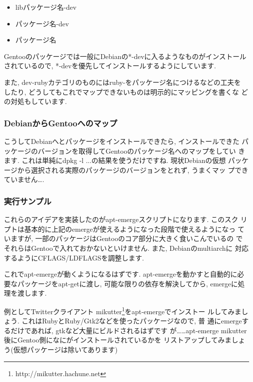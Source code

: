 \documentclass[mingoth,a4paper]{jsarticle}
\begin{document}
\begin{itemize}
\item libパッケージ名-dev
\item パッケージ名-dev
\item パッケージ名
\end{itemize}

Gentooのパッケージでは一般にDebianの*-devに入るようなものがインストール
されているので, *-devを優先してインストールするようにしています. 

また, dev-rubyカテゴリのものにはruby-をパッケージ名につけるなどの工夫を
したり, どうしてもこれでマップできないものは明示的にマッピングを書くな
どの対処もしています.

\subsubsection{DebianからGentooへのマップ}

こうしてDebianへとパッケージをインストールできたら, インストールできた
パッケージのバージョンを取得してGentooのパッケージ名へのマップをしてい
きます. これは単純にdpkg -l ...の結果を使うだけですね. 現状Debianの仮想
パッケージから選択される実際のパッケージのバージョンをとれず, うまくマッ
プできていません….

\subsubsection{実行サンプル}

これらのアイデアを実装したのがapt-emergeスクリプトになります. このスク
リプトは基本的に上記のemergeが使えるようになった段階で使えるようになっ
ていますが, 一部のパッケージはGentooのコア部分に大きく食いこんでいるの
でそれらはGentooで入れておかないといけません. また, Debianのmultiarchに
対応するようにCFLAGS/LDFLAGSを調整します.
 

これでapt-emergeが動くようになるはずです. apt-emergeを動かすと自動的に必要なパッケージをapt-getに渡し, 可能な限りの依存を解決してから, emergeに処理を渡します.

例としてTwitterクライアント
mikutter\footnote{http://mikutter.hachune.net}をapt-emergeでインストー
ルしてみましょう. これはRubyとRuby/Gtk2などを使ったパッケージなので, 普
通にemergeするだけであれば, gtkなど大量にビルドされるはずです
が……apt-emerge mikutter後にGentoo側になにがインストールされているかを
リストアップしてみましょう(仮想パッケージは除いてあります)
\end{document}
